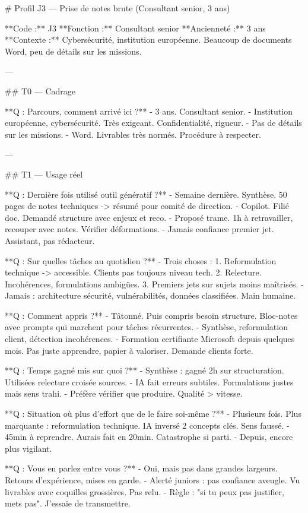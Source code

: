 # Profil J3 — Prise de notes brute (Consultant senior, 3 ans)

**Code :** J3  
**Fonction :** Consultant senior  
**Ancienneté :** 3 ans  
**Contexte :** Cybersécurité, institution européenne. Beaucoup de documents Word, peu de détails sur les missions.

---

## T0 — Cadrage

**Q : Parcours, comment arrivé ici ?**
- 3 ans. Consultant senior.
- Institution européenne, cybersécurité. Très exigeant. Confidentialité, rigueur.
- Pas de détails sur les missions.
- Word. Livrables très normés. Procédure à respecter.

---

## T1 — Usage réel

**Q : Dernière fois utilisé outil génératif ?**
- Semaine dernière. Synthèse. 50 pages de notes techniques -> résumé pour comité de direction.
- Copilot. Filié doc. Demandé structure avec enjeux et reco.
- Proposé trame. 1h à retravailler, recouper avec notes. Vérifier déformations.
- Jamais confiance premier jet. Assistant, pas rédacteur.

**Q : Sur quelles tâches au quotidien ?**
- Trois choses :
  1. Reformulation technique -> accessible. Clients pas toujours niveau tech.
  2. Relecture. Incohérences, formulations ambigües.
  3. Premiers jets sur sujets moins maîtrisés.
- Jamais : architecture sécurité, vulnérabilités, données classifiées. Main humaine.

**Q : Comment appris ?**
- Tâtonné. Puis compris besoin structure. Bloc-notes avec prompts qui marchent pour tâches récurrentes.
- Synthèse, reformulation client, détection incohérences.
- Formation certifiante Microsoft depuis quelques mois. Pas juste apprendre, papier à valoriser. Demande clients forte.

**Q : Temps gagné mis sur quoi ?**
- Synthèse : gagné 2h sur structuration. Utilisées relecture croisée sources.
- IA fait erreurs subtiles. Formulations justes mais sens trahi.
- Préfère vérifier que produire. Qualité > vitesse.

**Q : Situation où plus d'effort que de le faire soi-même ?**
- Plusieurs fois. Plus marquante : reformulation technique. IA inversé 2 concepts clés. Sens faussé.
- 45min à reprendre. Aurais fait en 20min. Catastrophe si parti.
- Depuis, encore plus vigilant.

**Q : Vous en parlez entre vous ?**
- Oui, mais pas dans grandes largeurs. Retours d'expérience, mises en garde.
- Alerté juniors : pas confiance aveugle. Vu livrables avec coquilles grossières. Pas relu.
- Règle : "si tu peux pas justifier, mets pas". J'essaie de transmettre.

